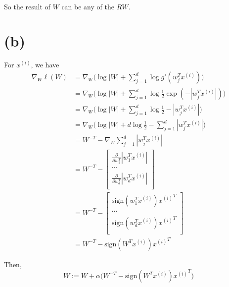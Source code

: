 \documentclass[11pt, a4paper]{article}
\begin{document}
    So the result of $W$ can be any of the $RW$.

    \section*{(b)}
    
    For $x^{(i)}$, we have
    \begin{align*}
        \nabla_W \ell(W)
        & = \nabla_W \big( \log |W| + \sum^d_{j=1} \log g' (w^T_j x^{(i)}) \big) \\
        & = \nabla_W \big(
            \log |W| + \sum^d_{j=1} \log \frac{1}{2} \exp (-|w^T_j x^{(i)}|)
        \big) \\
        & = \nabla_W \big(
            \log |W| + \sum^d_{j=1} \log \frac{1}{2} -|w^T_j x^{(i)}|
        \big) \\
        & = \nabla_W \big(
            \log |W| + d \log \frac{1}{2} - \sum^d_{j=1} |w^T_j x^{(i)}|
        \big) \\
        & = W^{-T} - \nabla_W \sum^d_{j=1} |w^T_j x^{(i)}| \\
        & = W^{-T} - \left[ \begin{array}{c}
            \frac{\partial}{\partial w^T_1} |w^T_1 x^{(i)}| \\
            \cdots \\
            \frac{\partial}{\partial w^T_d} |w^T_d x^{(i)}| \\
        \end{array}
        \right] \\
        & = W^{-T} - \left[ \begin{array}{c}
            \text{sign}(w^T_1 x^{(i)}) {x^{(i)}}^T \\
            \cdots \\
            \text{sign}(w^T_d x^{(i)}) {x^{(i)}}^T \\
        \end{array}
        \right] \\
        & = W^{-T} - \text{sign}(W^T x^{(i)}) {x^{(i)}}^T
    \end{align*}

    Then,
    $$W := W + \alpha \big( W^{-T} - \text{sign}(W^T x^{(i)}) {x^{(i)}}^T \big)$$
\end{document}
